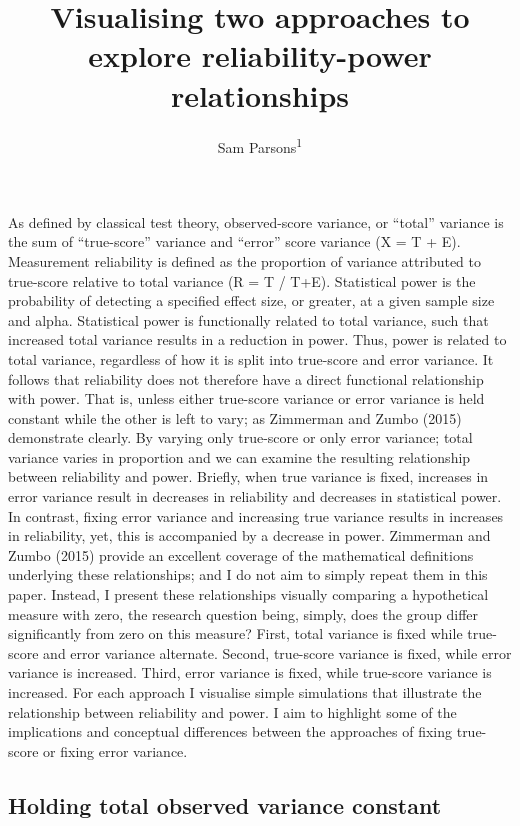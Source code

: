 \documentclass[english,,man]{apa6}
\title{Visualising two approaches to explore reliability-power relationships}
\author{Sam Parsons\textsuperscript{1}}
\date{}
\affiliation{
\vspace{0.5cm}
\textsuperscript{1} University of Oxford}
\begin{document}
\maketitle

As defined by classical test theory, observed-score variance, or \enquote{total} variance is the sum of \enquote{true-score} variance and \enquote{error} score variance (X = T + E). Measurement reliability is defined as the proportion of variance attributed to true-score relative to total variance (R = T / T+E). Statistical power is the probability of detecting a specified effect size, or greater, at a given sample size and alpha. Statistical power is functionally related to total variance, such that increased total variance results in a reduction in power. Thus, power is related to total variance, regardless of how it is split into true-score and error variance. It follows that reliability does not therefore have a direct functional relationship with power. That is, unless either true-score variance or error variance is held constant while the other is left to vary; as Zimmerman and Zumbo (2015) demonstrate clearly. By varying only true-score or only error variance; total variance varies in proportion and we can examine the resulting relationship between reliability and power. Briefly, when true variance is fixed, increases in error variance result in decreases in reliability and decreases in statistical power. In contrast, fixing error variance and increasing true variance results in increases in reliability, yet, this is accompanied by a decrease in power. Zimmerman and Zumbo (2015) provide an excellent coverage of the mathematical definitions underlying these relationships; and I do not aim to simply repeat them in this paper. Instead, I present these relationships visually comparing a hypothetical measure with zero, the research question being, simply, does the group differ significantly from zero on this measure? First, total variance is fixed while true-score and error variance alternate. Second, true-score variance is fixed, while error variance is increased. Third, error variance is fixed, while true-score variance is increased. For each approach I visualise simple simulations that illustrate the relationship between reliability and power. I aim to highlight some of the implications and conceptual differences between the approaches of fixing true-score or fixing error variance.

\hypertarget{holding-total-observed-variance-constant}{%
\subsection{Holding total observed variance constant}\label{holding-total-observed-variance-constant}}
\end{document}
